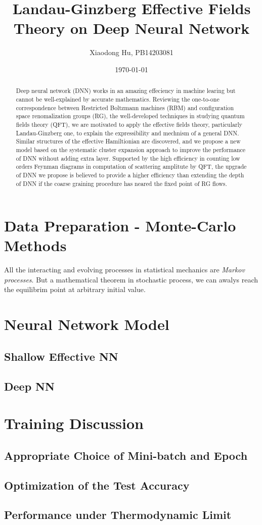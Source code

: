\documentclass[prl,aps,twocolumn]{revtex4}
\begin{document}
\draft

\title{Landau-Ginzberg Effective Fields Theory on Deep Neural Network}
\author {Xiaodong Hu, PB14203081}
\date{\today}

\begin{abstract}
Deep neural network (DNN) works in an amazing effeciency in machine learing but cannot be well-explained by accurate mathematics. Reviewing the one-to-one correspondence between Restricted Boltzmann machines (RBM) and configuration space renomalization groups (RG), the well-developed techniques in studying quantum fields theory (QFT), we are motivated to apply the effective fields theory, particularly Landau-Ginzberg one, to explain the expressibility and mechnism of a general DNN. Similar structures of the effective Hamiltionian are discovered, and we propose a new model based on the systematic cluster expansion approach to improve the performance of DNN without adding extra layer. Supported by the high efficiency in counting low orders Feynman diagrams in computation of scattering amplitute by QFT, the upgrade of DNN we propose is believed to provide a higher efficiency than extending the depth of DNN if the coarse graining procedure has neared the fixed point of RG flows.

\end{abstract}

\pacs{}
\maketitle

\section{Data Preparation - Monte-Carlo Methods}
	All the interacting and evolving processes in statistical mechanics are \emph{Markov processes}. But a mathematical theorem in stochastic process, we can awalys reach the equilibrim point at arbitrary initial value.
\section{Neural Network Model}
	\subsection{Shallow Effective NN}

	\subsection{Deep NN}

\section{Training Discussion}
	\subsection{Appropriate Choice of Mini-batch and Epoch}
	\subsection{Optimization of the Test Accuracy}
	\subsection{Performance under Thermodynamic Limit}
\end{document}
